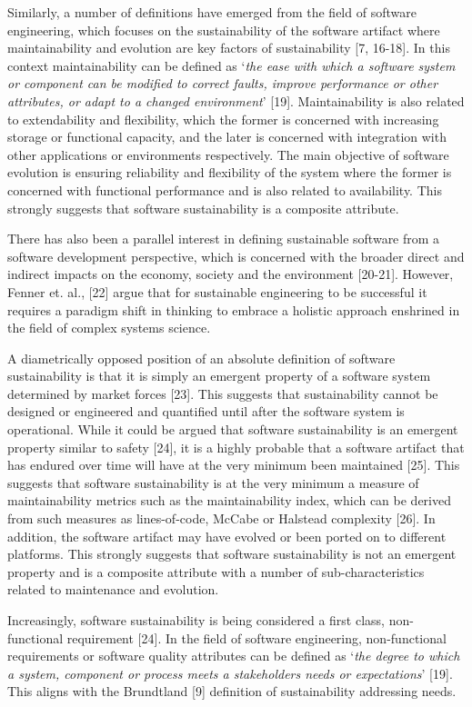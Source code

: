 \documentclass[preprint,12pt,authoryear]{elsarticle}
\begin{document}
Similarly, a number of definitions have emerged from the field of
software engineering, which focuses on the sustainability of the
software artifact where maintainability and evolution are key factors
of sustainability [7, 16-18]. In this context maintainability can be
defined as `{\emph{the ease with which a software system or component
can be modified to correct faults, improve performance or other
attributes, or adapt to a changed environment}}' [19]. Maintainability
is also related to extendability and flexibility, which the former is
concerned with increasing storage or functional capacity, and the
later is concerned with integration with other applications or
environments respectively. The main objective of software evolution is
ensuring reliability and flexibility of the system where the former is
concerned with functional performance and is also related to
availability. This strongly suggests that software sustainability is a
composite attribute.

There has also been a parallel interest in defining sustainable
software from a software development perspective, which is concerned
with the broader direct and indirect impacts on the economy, society
and the environment [20-21]. However, Fenner et. al., [22] argue that
for sustainable engineering to be successful it requires a paradigm
shift in thinking to embrace a holistic approach enshrined in the
field of complex systems science.

A diametrically opposed position of an absolute definition of software
sustainability is that it is simply an emergent property of a software
system determined by market forces [23]. This suggests that
sustainability cannot be designed or engineered and quantified until
after the software system is operational. While it could be argued
that software sustainability is an emergent property similar to safety
[24], it is a highly probable that a software artifact that has
endured over time will have at the very minimum been maintained
[25]. This suggests that software sustainability is at the very
minimum a measure of maintainability metrics such as the
maintainability index, which can be derived from such measures as
lines-of-code, McCabe or Halstead complexity [26]. In addition, the
software artifact may have evolved or been ported on to different
platforms. This strongly suggests that software sustainability is not
an emergent property and is a composite attribute with a number of
sub-characteristics related to maintenance and evolution.

Increasingly, software sustainability is being considered a first
class, non-functional requirement [24]. In the field of software
engineering, non-functional requirements or software quality
attributes can be defined as `{\emph{the degree to which a system,
component or process meets a stakeholders needs or expectations}}'
[19]. This aligns with the Brundtland [9] definition of sustainability
addressing needs.
\end{document}
